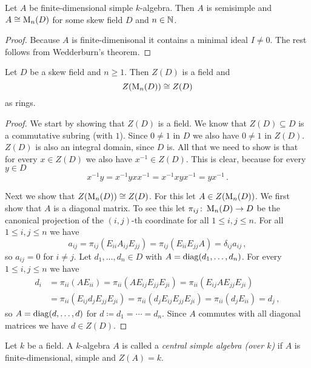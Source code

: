 \begin{corollary}
  Let $A$ be finite-dimensional simple $k$-algebra.
  Then $A$ is semisimple and $A \cong \operatorname{M}_n(D)$ for some skew field $D$ and $n \in \mathbb{N}$.
\end{corollary}
\begin{proof}
  Because $A$ is finite-dimenisonal it contains a minimal ideal $I \neq 0$.
  The rest follows from Wedderburn’s theorem.
\end{proof}


\begin{lemma}
  Let $D$ be a skew field and $n \geq 1$.
  Then $Z(D)$ is a field and
  \[
    Z(\operatorname{M}_n(D)) \cong Z(D)
  \]
  as rings.
\end{lemma}
\begin{proof}
  We start by showing that $Z(D)$ is a field.
  We know that $Z(D) \subseteq D$ is a commutative subring (with $1$).
  Since $0 \neq 1$ in $D$ we also have $0 \neq 1$ in $Z(D)$.
  $Z(D)$ is also an integral domain, since $D$ is.
  All that we need to show is that for every $x \in Z(D)$ we also have $x^{-1} \in Z(D)$.
  This is clear, because for every $y \in D$
  \[
      x^{-1} y
    = x^{-1} y x x^{-1}
    = x^{-1} x y x^{-1}
    = y x^{-1} \,.
  \]
  
  Next we show that $Z(\operatorname{M}_n(D)) \cong Z(D)$.
  For this let $A \in Z(\operatorname{M}_n(D))$.
  We first show that $A$ is a diagonal matrix.
  To see this let $\pi_{ij} \colon \operatorname{M}_n(D) \to D$ be the canonical projection of the $(i,j)$-th coordinate for all $1 \leq i,j \leq n$.
  For all $1 \leq i,j \leq n$ we have
  \[
      a_{ij}
    = \pi_{ij}(E_{ii} A_{ij} E_{jj})
    = \pi_{ij}(E_{ii} E_{jj} A)
    = \delta_{ij} a_{ij} \,,
  \]
  so $a_{ij} = 0$ for $i \neq j$.
  Let $d_1, \dotsc, d_n \in D$ with $A = \operatorname{diag}(d_1, \dotsc, d_n)$.
  For every $1 \leq i,j \leq n$ we have
  \begin{align*}
        d_i
    &=  \pi_{ii}(A E_{ii})
     =  \pi_{ii}(A E_{ij} E_{jj} E_{ji})
     =  \pi_{ii}(E_{ij} A E_{jj} E_{ji}) \\
    &=  \pi_{ii}(E_{ij} d_j E_{jj} E_{ji})
     =  \pi_{ii}(d_j E_{ij} E_{jj} E_{ji})
     =  \pi_{ii}(d_j E_{ii})
     =  d_j \,,
  \end{align*}
  so $A = \operatorname{diag}(d, \dotsc, d)$ for $d \coloneqq d_1 = \dotsb = d_n$.
  Since $A$ commutes with all diagonal matrices we have $d \in Z(D)$.
\end{proof}


\begin{definition}
  Let $k$ be a field.
  A $k$-algebra $A$ is called a \emph{central simple algebra (over $k$)} if $A$ is finite-dimensional, simple and $Z(A) = k$.
\end{definition}



